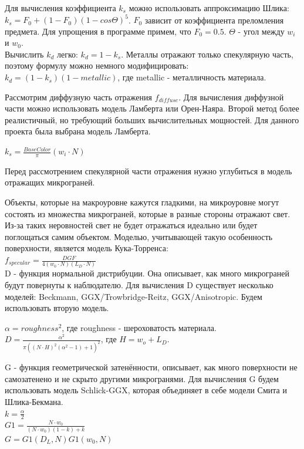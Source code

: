 \documentclass[a4paper,14pt]{extarticle}
\begin{document}
Для вычисления коэффициента $k_s$ можно использовать аппроксимацию Шлика:\\
$k_s = F_0 + (1 - F_0)(1 - cos \Theta)^5$. $F_0$ зависит от коэффициента преломления предмета. 
Для упрощения в программе примем, что $F_0 = 0.5$.
$\Theta$ - угол между $w_i$ и $w_0$.\\
Вычислить $k_d$ легко: $k_d = 1 - k_s$. Металлы отражают только спекулярную часть, поэтому формулу можно немного модифицировать:\\
$k_d = (1 - k_s) (1 - metallic)$, где metallic - металличность материала.

Рассмотрим диффузную часть отражения $f_{diffuse}$. Для вычисления диффузной части можно использовать модель Ламберта или Орен-Наяра. 
Второй метод более реалистичный, но требующий больших вычислительных мощностей. Для данного проекта была выбрана модель Ламберта.

$k_s = \frac{BaseColor}{\pi} (w_i \cdot N)$

Перед рассмотрением спекулярной части отражения нужно углубиться в модель отражащих микрограней.

Объекты, которые на макроуровне кажутся гладкими, на микроуровне могут состоять из множества микрограней, 
которые в разные стороны отражают свет. Из-за таких неровностей свет не будет отражаться идеально или будет поглощаться самим объектом.
Моделью, учитывающей такую особенность поверхности, является модель Кука-Торренса:\\

$f_{specular} = \frac{DGF}{4(w_0 \cdot N)(L_D \cdot N)}$\\

D - функция нормальной дистрибуции. Она описывает, как много микрограней будут повернуты к наблюдателю. 
Для вычисления D существует несколько моделей: Beckmann, GGX/Trowbridge-Reitz, GGX/Anisotropic. Будем использовать вторую модель.

$\alpha = roughness^2$, где roughness - шероховатость материала.\\
$D = \frac{\alpha^2}{\pi((N \cdot H)^2(\alpha ^ 2 - 1) + 1)^2}$, где $H = w_o + L_D$.

G - функция геометрической затенённости, описывает, как много поверхности не самозатенено и не скрыто другими микрогранями.
Для вычисления G будем использовать модель Schlick-GGX, которая объединяет в себе модели Смита и Шлика-Бекмана.\\
$k = \frac{\alpha}{2}$\\
$G1 = \frac{N \cdot w_0}{(N \cdot w_0)(1 - k) + k}$\\
$G = G1(D_L, N) G1(w_0, N)$\\
\end{document}
